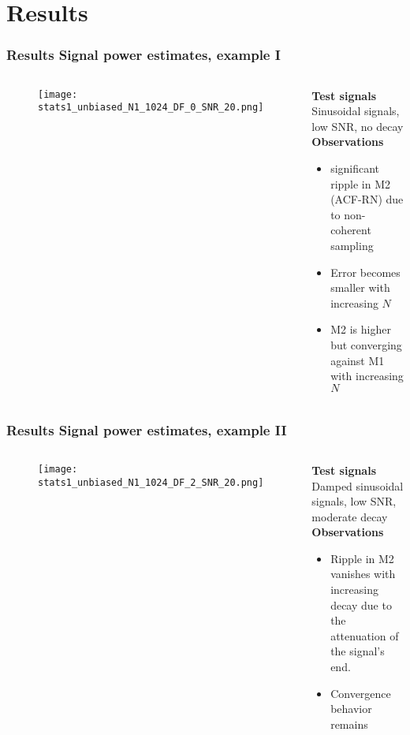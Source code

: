 \documentclass[11pt,aspectratio=169]{beamer}
\begin{document}
	\section{Results}
	\begin{frame}
		\frametitle{Results \textendash{} Signal power estimates, example I}
		\begin{columns}[t]
			\begin{RIPcolleft}
				\begin{figure}
					\texttt{[image: stats1\_unbiased\_N1\_1024\_DF\_0\_SNR\_20.png]}
				\end{figure}
			\end{RIPcolleft}
			\begin{RIPcolright}
				\textbf{Test signals}\\
				Sinusoidal signals, low SNR, no decay\\
				\vspace*{.5em}
				\textbf{Observations}\\
				\begin{itemize}
					\item significant ripple in M2 (ACF-RN) due to non-coherent sampling
					\item Error becomes smaller with increasing $N$
					\item M2 is higher but converging against M1 with increasing $N$
				\end{itemize}
			\end{RIPcolright}
		\end{columns}
	\end{frame}
	\begin{frame}
		\frametitle{Results \textendash{} Signal power estimates, example II}
		\begin{columns}[t]
			\begin{RIPcolleft}
				\begin{figure}
					\texttt{[image: stats1\_unbiased\_N1\_1024\_DF\_2\_SNR\_20.png]}
				\end{figure}
			\end{RIPcolleft}
			\begin{RIPcolright}
				\textbf{Test signals}\\
				Damped sinusoidal signals, low SNR, moderate decay\\
				\vspace*{.5em}
				\textbf{Observations}\\
				\begin{itemize}
					\item Ripple in M2 vanishes with increasing decay due to the attenuation of the signal's end.
					\item Convergence behavior remains
				\end{itemize}
			\end{RIPcolright}
		\end{columns}
	\end{frame}
\end{document}
